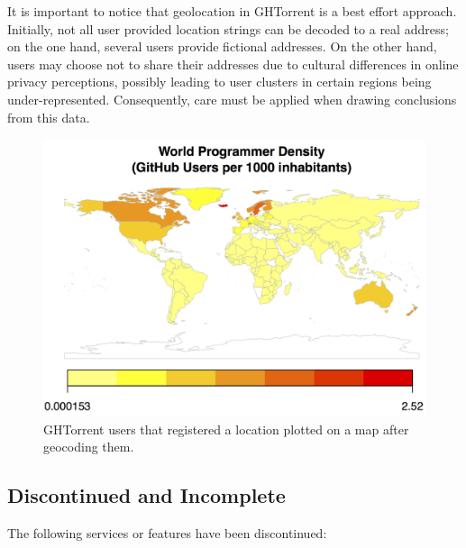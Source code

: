 \documentclass{sig-alternate}
\begin{document}
It is important to notice that geolocation in GHTorrent is a best effort
approach. Initially, not all user provided location strings can be decoded to a
real address; on the one hand, several users provide fictional addresses.  On
the other hand, users may choose not to share their addresses due to cultural
differences in online privacy perceptions, possibly leading to user clusters in
certain regions being under-represented. Consequently, care must be applied
when drawing conclusions from this data.

\begin{figure}
  \begin{center}
    \includegraphics[scale=0.2]{dev-map.png}
  \end{center}
  \caption{GHTorrent users that registered a location plotted on a map after
  geocoding them.}
  \label{fig:dev-map}
\end{figure}

\subsection{Discontinued and Incomplete}

The following services or features have been discontinued:
\end{document}
